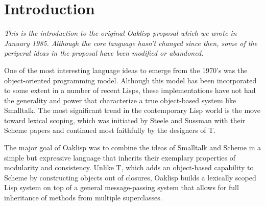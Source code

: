 %
%
%


\chapter{Introduction}

\emph{This is the introduction to the original Oaklisp proposal which
we wrote in January 1985.  Although the core language hasn't changed
since then, some of the periperal ideas in the proposal have been
modified or abandoned.}

One of the most interesting language ideas to emerge from the 1970's
was the object-oriented programming model.  Although this model has
been incorporated to some extent in a number of recent Lisps, these
implementations have not had the generality and power that
characterize a true object-based system like Smalltalk.  The most
significant trend in the contemporary Lisp world is the move toward
lexical scoping, which was initiated by Steele and Sussman with their
Scheme papers and continued most faithfully by the designers of T.

The major goal of Oaklisp was to combine the ideas of Smalltalk and
Scheme in a simple but expressive language that inherits their
exemplary properties of modularity and consistency.  Unlike T, which
adds an object-based capability to Scheme by constructing objects out
of closures, Oaklisp builds a lexically scoped Lisp system on top of a
general message-passing system that allows for full inheritance of
methods from multiple superclasses.


